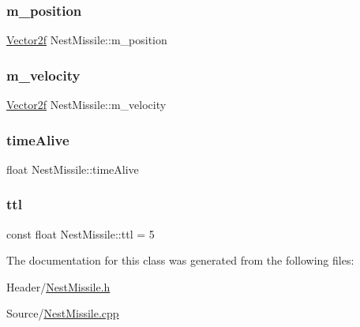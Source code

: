 \subsubsection{\texorpdfstring{m\_position}{m\_position}}
{\footnotesize\ttfamily \mbox{\hyperlink{class_vector2f}{Vector2f}} Nest\+Missile\+::m\+\_\+position}

\mbox{\label{class_nest_missile_a3bdbbd200131b67ba061f17f0303455b}} 
\subsubsection{\texorpdfstring{m\_velocity}{m\_velocity}}
{\footnotesize\ttfamily \mbox{\hyperlink{class_vector2f}{Vector2f}} Nest\+Missile\+::m\+\_\+velocity}

\mbox{\label{class_nest_missile_a5780098c2ece04024fe80f198326afef}} 
\subsubsection{\texorpdfstring{timeAlive}{timeAlive}}
{\footnotesize\ttfamily float Nest\+Missile\+::time\+Alive}

\mbox{\label{class_nest_missile_a51e665742f8a19c90f533bed00149876}} 
\subsubsection{\texorpdfstring{ttl}{ttl}}
{\footnotesize\ttfamily const float Nest\+Missile\+::ttl = 5}



The documentation for this class was generated from the following files\+:\begin{DoxyCompactItemize}
\item 
Header/\mbox{\hyperlink{_nest_missile_8h}{Nest\+Missile.\+h}}\item 
Source/\mbox{\hyperlink{_nest_missile_8cpp}{Nest\+Missile.\+cpp}}\end{DoxyCompactItemize}
